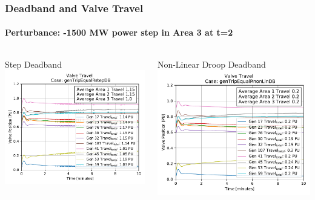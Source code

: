 \documentclass[14pt, unknownkeysallowed]{beamer}
\begin{document}
\begin{frame}
\frametitle{Deadband and Valve Travel}
\framesubtitle{Perturbance: -1500 MW power step in Area 3 at t=2}
\begin{columns}
\begin{column}{.5\linewidth}
{\tiny Step Deadband}
	\includegraphics[width=\linewidth]{genTripEqualRstepDBValveTravel01}
\end{column}
\begin{column}{.5\linewidth}
{\tiny Non-Linear Droop Deadband}
	\includegraphics[width=\linewidth]{genTripEqualRnonLinDBValveTravel01}
\end{column}
\end{columns}
\end{frame}
\end{document}
